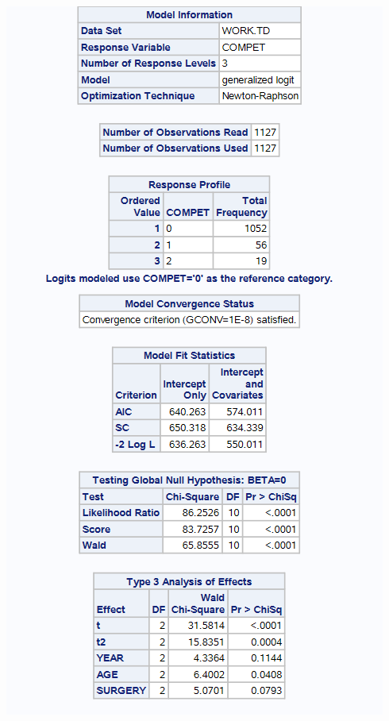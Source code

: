 \documentclass[
  12pt,
  letterpaper,
  DIV=11,
  numbers=noendperiod,
  onepage,
  openany]{scrreprt}
\begin{document}
\includegraphics{sas/9i.PNG}
\end{document}
